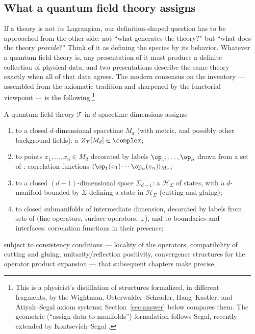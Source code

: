 \subsection{What a quantum field theory assigns}
\label{sec:inventory}

If a theory is not its Lagrangian, our definition-shaped question has to be
approached from the other side: not ``what generates the theory?'' but ``what
does the theory \emph{provide}?'' Think of it as defining the species by its
behavior. Whatever a quantum field theory is, any presentation of it must
produce a definite collection of physical data, and two presentations describe
the same theory exactly when all of that data agrees. The modern consensus on
the inventory --- assembled from the axiomatic tradition and sharpened by the
functorial viewpoint --- is the following.\footnote{This is a physicist's
distillation of structures formalized, in different fragments, by the Wightman,
Osterwalder--Schrader, Haag--Kastler, and Atiyah--Segal axiom systems;
Section~\ref{sec:answer} below compares them. The geometric (``assign
data to manifolds'') formulation follows Segal, recently extended by
Kontsevich--Segal .}

\begin{ddefinition}
\label{def:inventory}
A quantum field theory $\mathcal{T}$ in $d$ spacetime dimensions assigns:
\begin{enumerate}
\item to a closed $d$-dimensional spacetime $M_d$ (with metric, and possibly
other background fields): a 
$Z_{\mathcal{T}}[M_d] \in \complex$;
\item to points $x_1, \dots, x_n \in M_d$ decorated by labels $\op_1, \dots,
\op_n$ drawn from a set of : correlation functions
$\langle \op_1(x_1) \cdots \op_n(x_n) \rangle_{M_d}$;
\item to a closed $(d-1)$-dimensional space $\Sigma_{d-1}$: a  $\mathcal{H}_{\Sigma}$ of states, with a $d$-manifold bounded by
$\Sigma$ defining a state in $\mathcal{H}_\Sigma$ (cutting and gluing);
\item to closed submanifolds of intermediate dimension, decorated by labels from
sets of  (line operators, surface operators, \dots),
and to boundaries and interfaces: correlation functions in their presence;
\end{enumerate}
subject to consistency conditions --- locality of the operators, compatibility
of cutting and gluing, unitarity/reflection positivity, convergence structures
for the operator product expansion --- that subsequent chapters make precise.
\end{ddefinition}

